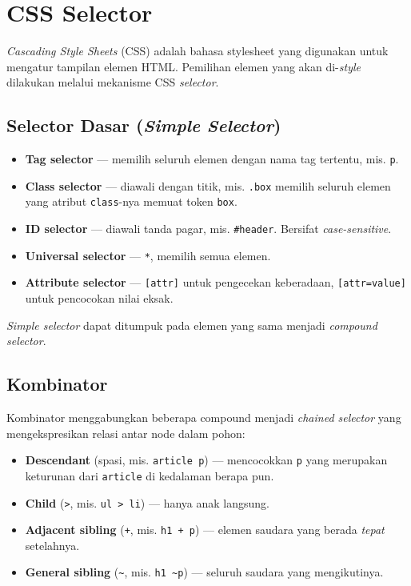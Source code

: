 \section{CSS Selector}

\textit{Cascading Style Sheets} (CSS) adalah bahasa stylesheet yang digunakan untuk mengatur tampilan elemen HTML. Pemilihan elemen yang akan di-\textit{style} dilakukan melalui mekanisme CSS \textit{selector}.

\subsection{Selector Dasar (\textit{Simple Selector})}
\begin{itemize}
    \item \textbf{Tag selector} --- memilih seluruh elemen dengan nama tag tertentu, mis. \texttt{p}.
    \item \textbf{Class selector} --- diawali dengan titik, mis. \texttt{.box} memilih seluruh elemen yang atribut \texttt{class}-nya memuat token \texttt{box}.
    \item \textbf{ID selector} --- diawali tanda pagar, mis. \texttt{\#header}. Bersifat \textit{case-sensitive}.
    \item \textbf{Universal selector} --- \texttt{*}, memilih semua elemen.
    \item \textbf{Attribute selector} --- \texttt{[attr]} untuk pengecekan keberadaan, \texttt{[attr=value]} untuk pencocokan nilai eksak.
\end{itemize}

\textit{Simple selector} dapat ditumpuk pada elemen yang sama menjadi \textit{compound selector}.

\subsection{Kombinator}
Kombinator menggabungkan beberapa compound menjadi \textit{chained selector} yang mengekspresikan relasi antar node dalam pohon:
\begin{itemize}
    \item \textbf{Descendant} (spasi, mis. \texttt{article p}) --- mencocokkan \texttt{p} yang merupakan keturunan dari \texttt{article} di kedalaman berapa pun.
    \item \textbf{Child} (\texttt{>}, mis. \texttt{ul > li}) --- hanya anak langsung.
    \item \textbf{Adjacent sibling} (\texttt{+}, mis. \texttt{h1 + p}) --- elemen saudara yang berada \textit{tepat} setelahnya.
    \item \textbf{General sibling} (\texttt{\textasciitilde}, mis. \texttt{h1 \textasciitilde p}) --- seluruh saudara yang mengikutinya.
\end{itemize}

